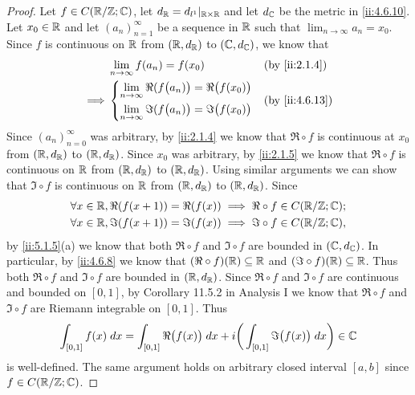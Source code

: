 \begin{proof}
  Let \(f \in C(\mathbb{R} / \mathbb{Z} ; \mathbb{C})\), let \(d_{\mathbb{R}} = d_{l^1}|_{\mathbb{R} \times \mathbb{R}}\) and let \(d_{\mathbb{C}}\) be the metric in \cref{ii:4.6.10}.
  Let \(x_0 \in \mathbb{R}\) and let \((a_n)_{n = 1}^\infty\) be a sequence in \(\mathbb{R}\) such that \(\lim_{n \to \infty} a_n = x_0\).
  Since \(f\) is continuous on \(\mathbb{R}\) from \((\mathbb{R}, d_{\mathbb{R}})\) to \((\mathbb{C}, d_{\mathbb{C}})\), we know that
  \begin{align*}
             & \lim_{n \to \infty} f(a_n) = f(x_0)                                           &  & \by{ii:2.1.4} \\
    \implies & \begin{dcases}
                 \lim_{n \to \infty} \Re(f\big(a_n)\big) = \Re\big(f(x_0)\big) \\
                 \lim_{n \to \infty} \Im(f\big(a_n)\big) = \Im\big(f(x_0)\big)
               \end{dcases} &  & \by{ii:4.6.13}
  \end{align*}
  Since \((a_n)_{n = 0}^\infty\) was arbitrary, by \cref{ii:2.1.4} we know that \(\Re \circ f\) is continuous at \(x_0\) from \((\mathbb{R}, d_{\mathbb{R}})\) to \((\mathbb{R}, d_{\mathbb{R}})\).
  Since \(x_0\) was arbitrary, by \cref{ii:2.1.5} we know that \(\Re \circ f\) is continuous on \(\mathbb{R}\) from \((\mathbb{R}, d_{\mathbb{R}})\) to \((\mathbb{R}, d_{\mathbb{R}})\).
  Using similar arguments we can show that \(\Im \circ f\) is continuous on \(\mathbb{R}\) from \((\mathbb{R}, d_{\mathbb{R}})\) to \((\mathbb{R}, d_{\mathbb{R}})\).
  Since
  \begin{align*}
     & \forall x \in \mathbb{R}, \Re(f(x + 1)) = \Re(f(x)) \implies \Re \circ f \in C(\mathbb{R} / \mathbb{Z} ; \mathbb{C}); \\
     & \forall x \in \mathbb{R}, \Im(f(x + 1)) = \Im(f(x)) \implies \Im \circ f \in C(\mathbb{R} / \mathbb{Z} ; \mathbb{C}),
  \end{align*}
  by \cref{ii:5.1.5}(a) we know that both \(\Re \circ f\) and \(\Im \circ f\) are bounded in \((\mathbb{C}, d_{\mathbb{C}})\).
  In particular, by \cref{ii:4.6.8} we know that \((\Re \circ f)(\mathbb{R}) \subseteq \mathbb{R}\) and \((\Im \circ f)(\mathbb{R}) \subseteq \mathbb{R}\).
  Thus both \(\Re \circ f\) and \(\Im \circ f\) are bounded in \((\mathbb{R}, d_{\mathbb{R}})\).
  Since \(\Re \circ f\) and \(\Im \circ f\) are continuous and bounded on \([0, 1]\), by Corollary 11.5.2 in Analysis I we know that \(\Re \circ f\) and \(\Im \circ f\) are Riemann integrable on \([0, 1]\).
  Thus
  \[
    \int_{[0, 1]} f(x) \; dx = \int_{[0, 1]} \Re\big(f(x)\big) \; dx + i \bigg(\int_{[0, 1]} \Im\big(f(x)\big) \; dx\bigg) \in \mathbb{C}
  \]
  is well-defined.
  The same argument holds on arbitrary closed interval \([a, b]\) since \(f \in C(\mathbb{R} / \mathbb{Z} ; \mathbb{C})\).
\end{proof}

